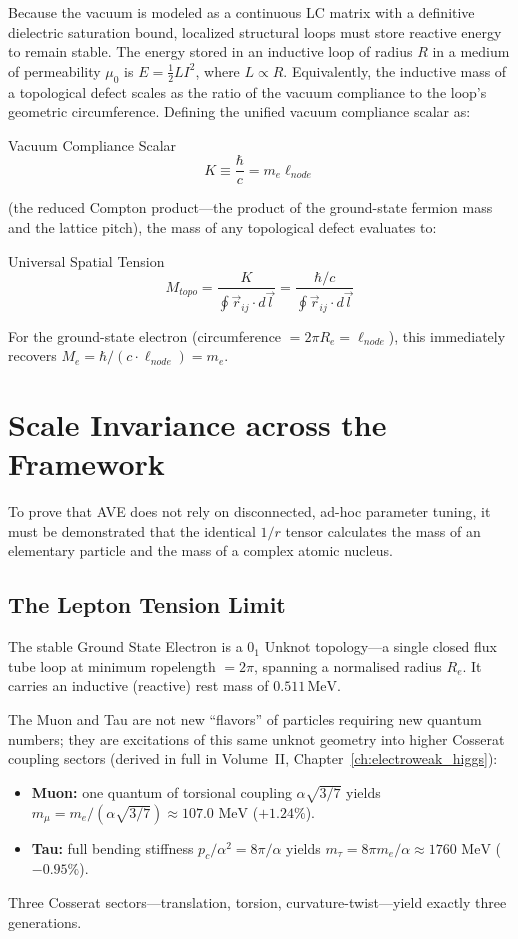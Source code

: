 Because the vacuum is modeled as a continuous LC matrix with a definitive dielectric saturation bound, localized structural loops must store reactive energy to remain stable. The energy stored in an inductive loop of radius $R$ in a medium of permeability $\mu_0$ is $E = \frac{1}{2}L I^2$, where $L \propto R$. Equivalently, the inductive mass of a topological defect scales as the ratio of the vacuum compliance to the loop's geometric circumference. Defining the unified vacuum compliance scalar as:
\begin{resultbox}{Vacuum Compliance Scalar}
\begin{equation}
    K \equiv \frac{\hbar}{c} = m_e \ell_{node}
\end{equation}
\end{resultbox}
(the reduced Compton product---the product of the ground-state fermion mass and the lattice pitch), the mass of any topological defect evaluates to:
\begin{resultbox}{Universal Spatial Tension}
\begin{equation}
    M_{topo} = \frac{K}{\oint \vec{r}_{ij} \cdot d\vec{l}} = \frac{\hbar/c}{\oint \vec{r}_{ij} \cdot d\vec{l}}
\end{equation}
\end{resultbox}

For the ground-state electron (circumference $= 2\pi R_e = \ell_{node}$), this immediately recovers $M_e = \hbar/(c \cdot \ell_{node}) = m_e$.

\section{Scale Invariance across the Framework}
To prove that AVE does not rely on disconnected, ad-hoc parameter tuning, it must be demonstrated that the identical $1/r$ tensor calculates the mass of an elementary particle and the mass of a complex atomic nucleus.

\subsection{The Lepton Tension Limit}
The stable Ground State Electron is a $0_1$ Unknot topology---a single closed flux tube loop at minimum ropelength $= 2\pi$, spanning a normalised radius $R_e$. It carries an inductive (reactive) rest mass of $0.511\,\text{MeV}$.

The Muon and Tau are not new ``flavors'' of particles requiring new quantum numbers; they are excitations of this same unknot geometry into higher Cosserat coupling sectors (derived in full in Volume~II, Chapter~\ref{ch:electroweak_higgs}):
\begin{itemize}
    \item \textbf{Muon:} one quantum of torsional coupling $\alpha\sqrt{3/7}$ yields $m_\mu = m_e/(\alpha\sqrt{3/7}) \approx 107.0 \text{ MeV}$ ($+1.24\%$).
    \item \textbf{Tau:} full bending stiffness $p_c/\alpha^2 = 8\pi/\alpha$ yields $m_\tau = 8\pi m_e / \alpha \approx 1760 \text{ MeV}$ ($-0.95\%$).
\end{itemize}
Three Cosserat sectors---translation, torsion, curvature-twist---yield exactly three generations.

